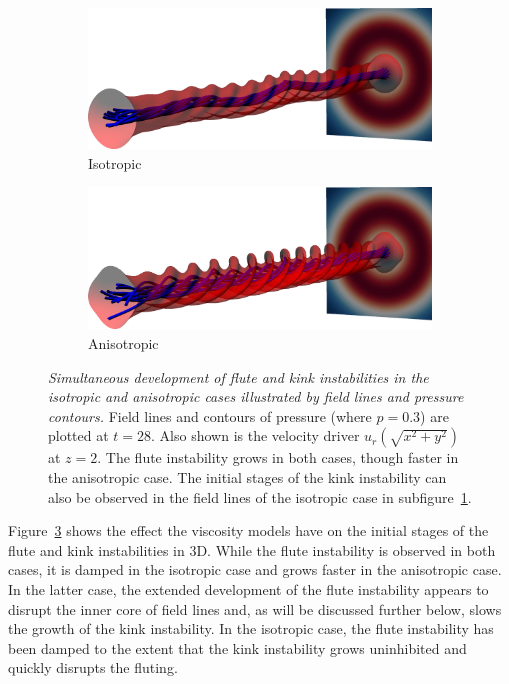 \documentclass[fleqn,usenatbib]{mnras}
\newcommand{\rs}[2]{{#2}}
\newcommand{\mycaption}[2]{\caption[#1]{\emph{#1} #2}}
\begin{document}
\begin{figure}
  \centering
    \begin{subfigure}{0.49\textwidth}
      \includegraphics[width=\linewidth]{field_line_plots/cropped/v-4r-4-isotropic_0014_cropped.png}
      \caption{Isotropic}
      \label{fig:field_line_plots_iso}
    \end{subfigure}
    \hfill
    \begin{subfigure}{0.49\textwidth}
      \includegraphics[width=\linewidth]{field_line_plots/cropped/v-4r-4-switching_0014_cropped.png}
      \caption{\rs{Switching}{Anisotropic}}
      \label{fig:field_line_plots_swi}
    \end{subfigure}
\mycaption{Simultaneous development of \rs{fluting}{flute} and kink
  instabilities in the isotropic and \rs{switching}{anisotropic} cases
  \rs{as}{illustrated by} field lines and pressure contours.}{Field
  lines and contours of pressure (where $p=0.3$) are plotted at
  $t=28$. Also shown is the velocity driver \rs{as a slice}{$u_r(\sqrt{x^2+y^2})$ at $z=2$}. The \rs{fluting}{flute} instability grows in both cases, though faster in the \rs{switching}{anisotropic} case. The initial stages of the kink instability can also be observed in the field lines of the isotropic case in subfigure~\ref{fig:field_line_plots_iso}.}
\label{fig:kink_field_line_plots}%
\end{figure}

Figure~\ref{fig:kink_field_line_plots} shows the effect the viscosity
models have on the initial stages of the \rs{fluting}{flute} and kink
instabilities in 3D. While the \rs{fluting}{flute} instability is
observed in both cases, it is damped in the isotropic case and grows
faster in the \rs{switching}{anisotropic} case. In the latter case,
the extended development of the \rs{fluting}{flute} instability
appears to disrupt the inner core of field lines and, \rs{(as shall be
  seen)}{as will be discussed further below,} slows the growth of the
kink instability. In the isotropic case, the \rs{fluting}{flute}
instability has been damped to the extent that the kink instability
grows uninhibited and quickly disrupts the fluting. 
\end{document}
